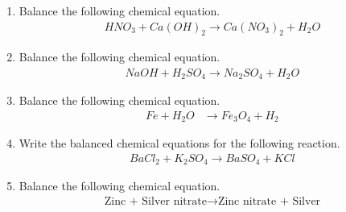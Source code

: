 \begin{enumerate}[label=\thesubsection.\arabic*.,ref=\thesubsection.\theenumi]
\item     Balance the following chemical equation.
    \begin{align}
        \label{eq:solutions/chem/6ato balance} HNO_{3}+ Ca(OH)_{2}\to Ca(NO_{3})_{2}+H_{2}O
    \end{align}
\solution

%
\item Balance the following chemical equation.
\begin{align}
  \label{matrix/50/eq1}
NaOH + H_2SO_4 \xrightarrow{} Na_2SO_4  +  H_2O
\end{align}
\item Balance the following chemical equation.
%
\begin{align}
\label{eq:chem_balance}
Fe+H_2O &\rightarrow Fe_3O_4 + H_2
\end{align}
\item Write the balanced chemical equations for the following reaction. 
\begin{align}
 BaCl_2 + K_2SO_4 \rightarrow BaSO_4 + KCl \label{eq:solutions/chemistry/7d:1}   
\end{align}
\item    Balance the following chemical equation.
    \begin{align}
        \label{eq:solutions/chem/7b1} \text{Zinc + Silver nitrate} \to \text{Zinc nitrate + Silver}
    \end{align}
\solution

\end{enumerate}
 

